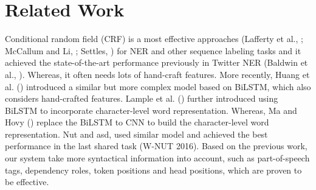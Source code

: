 \section{Related Work}
\label{sec:related}
Conditional random field (CRF) is a most effective approaches (Lafferty et al., \citeyear{DBLP:conf/icml/LaffertyMP01}; McCallum
and Li, \citeyear{DBLP:conf/conll/McCallum003}; Settles, \citeyear{settles2004biomedical}) for NER and other sequence labeling tasks and it achieved the state-of-the-art performance previously in Twitter NER (Baldwin et al., \citeyear{baldwin2015shared}). 
Whereas, it often needs lots of hand-craft features.
More recently, Huang et al. (\citeyear{DBLP:journals/corr/HuangXY15}) introduced a similar but more complex model based on BiLSTM, which also considers hand-crafted features. 
Lample et al. (\citeyear{DBLP:conf/naacl/2016}) further introduced using BiLSTM to incorporate character-level word representation. Whereas, Ma and Hovy (\citeyear{DBLP:conf/acl/MaH16}) replace the BiLSTM to CNN to build the character-level word representation. Nut and asd, used similar model and achieved the best performance in the last shared task (W-NUT 2016). 
Based on the previous work, our system take more syntactical information into account, such as part-of-speech tags, dependency roles, token positions and head positions, which are proven to be effective.
 


